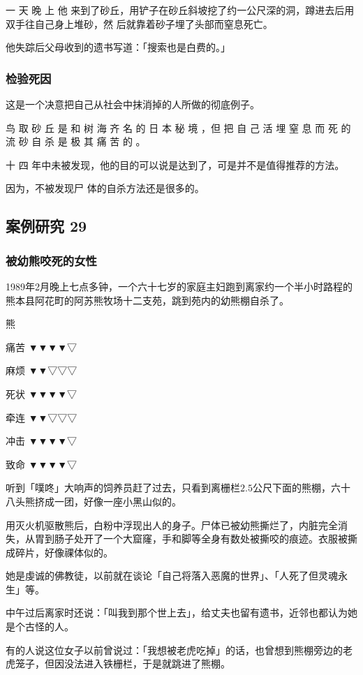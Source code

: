 \documentclass[UTF8]{ctexart}
\begin{document}
一 天 晚 上 他 来到了砂丘，用铲子在砂丘斜坡挖了约一公尺深的洞，蹲进去后用双手往自己身上堆砂，然 后就靠着砂子埋了头部而窒息死亡。 

他失踪后父母收到的遗书写道：「搜索也是白费的。」

\subsubsection*{检验死因}

这是一个决意把自己从社会中抹消掉的人所做的彻底例子。

鸟 取 砂 丘 是 和 树 海 齐 名 的 日 本 秘 境 ，但 把 自 己 活 埋 窒 息 而 死 的 流 砂 自 杀 是 极 其 痛 苦 的 。

十 四 年中未被发现，他的目的可以说是达到了，可是并不是值得推荐的方法。

因为，不被发现尸 体的自杀方法还是很多的。


\subsection{案例研究 29}

\subsubsection*{被幼熊咬死的女性}

1989年2月晚上七点多钟，一个六十七岁的家庭主妇跑到离家约一个半小时路程的熊本县阿花町的阿苏熊牧场十二支苑，跳到苑内的幼熊棚自杀了。

熊

痛苦 ▼▼▼▼▽ 

麻烦 ▼▼▽▽▽ 

死状 ▼▼▼▼▽

牵连 ▼▼▽▽▽

冲击 ▼▼▼▼▽

致命 ▼▼▼▼▽

听到「噗咚」大响声的饲养员赶了过去，只看到离栅栏$2.5$公尺下面的熊棚，六十八头熊挤成一团，好像一座小黑山似的。

用灭火机驱散熊后，白粉中浮现出人的身子。尸体已被幼熊撕烂了，内脏完全消失，从胃到肠子处开了一个大窟窿，手和脚等全身有数处被撕咬的痕迹。衣服被撕成碎片，好像祼体似的。

她是虔诚的佛教徒，以前就在谈论「自己将落入恶魔的世界」、「人死了但灵魂永生」等。

中午过后离家时还说：「叫我到那个世上去」，给丈夫也留有遗书，近邻也都认为她是个古怪的人。
 
有的人说这位女子以前曾说过：「我想被老虎吃掉」的话，也曾想到熊棚旁边的老虎笼子，但因没法进入铁栅栏，于是就跳进了熊棚。
\end{document}
